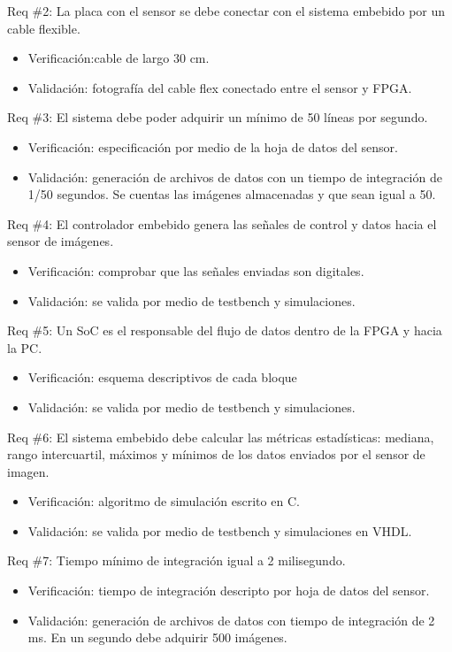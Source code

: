 \documentclass[
11pt, %
codirector, %
]{charter}
\begin{document}
Req \#2: La placa con el sensor se debe conectar con el sistema embebido por un cable flexible.
\begin{itemize}
\item Verificación:cable de largo 30 cm. 
\item Validación: fotografía del cable flex conectado entre el sensor y FPGA.
\end{itemize}

Req \#3: El sistema debe poder adquirir un mínimo de 50 líneas por segundo.
\begin{itemize}
\item Verificación: especificación por medio de la  hoja de datos del sensor.
\item Validación: generación de archivos de datos con un tiempo de integración de 1/50 segundos. Se cuentas las imágenes  almacenadas y que sean igual a 50.
\end{itemize}


Req \#4: El controlador embebido genera las señales de control y datos hacia el sensor de imágenes.
\begin{itemize}
\item Verificación: comprobar que las señales enviadas son digitales.
\item Validación: se valida por medio de testbench y simulaciones.
\end{itemize}

Req \#5: Un SoC es el responsable del flujo de datos dentro de la FPGA y hacia la PC.
\begin{itemize}
\item Verificación: esquema descriptivos de cada bloque
\item Validación: se valida por medio de testbench y simulaciones.
\end{itemize}

Req \#6: El sistema embebido debe calcular las métricas estadísticas: mediana, rango intercuartil, máximos y mínimos de los datos enviados por el sensor de imagen.
\begin{itemize}
\item Verificación: algoritmo de simulación escrito en C.
\item Validación: se valida por medio de testbench y simulaciones en VHDL.
\end{itemize}

Req \#7: Tiempo mínimo de integración igual a 2 milisegundo.
\begin{itemize}
\item Verificación: tiempo de integración descripto por hoja de datos del sensor.
\item Validación: generación de archivos de datos con tiempo de integración de 2 ms. En un segundo debe adquirir 500 imágenes.
\end{itemize}
\end{document}
